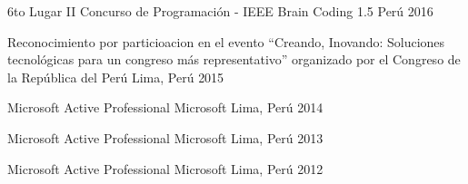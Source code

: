 



\begin{cvhonors}

  \cvhonor
    {6to Lugar} %
    {II Concurso de Programación - IEEE Brain Coding 1.5} %
    {Perú} %
    {2016} %

  \cvhonor
    {Reconocimiento} %
    {por particioacion en el evento ``Creando, Inovando: Soluciones tecnológicas para un congreso más representativo'' organizado por el Congreso de la República del Perú} %
    {Lima, Perú} %
    {2015} %

  \cvhonor
    {Microsoft Active Professional} %
    {Microsoft} %
    {Lima, Perú} %
    {2014} %

  \cvhonor
    {Microsoft Active Professional} %
    {Microsoft} %
    {Lima, Perú} %
    {2013} %

  \cvhonor
    {Microsoft Active Professional} %
    {Microsoft} %
    {Lima, Perú} %
    {2012} %

\end{cvhonors}
